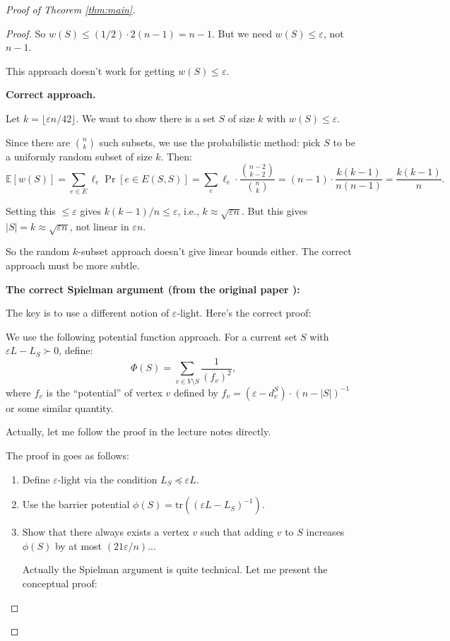 \documentclass[12pt]{article}
\begin{document}
\begin{proof}[Proof of Theorem \ref{thm:main}]
\begin{proof}
So $w(S) \leq (1/2) \cdot 2(n-1) = n-1$. But we need $w(S) \leq \varepsilon$, not $n-1$.

This approach doesn't work for getting $w(S) \leq \varepsilon$.

\textbf{Correct approach.}

Let $k = \lfloor \varepsilon n / 42 \rfloor$. We want to show there is a set $S$ of size $k$ with $w(S) \leq \varepsilon$.

Since there are $\binom{n}{k}$ such subsets, we use the probabilistic method: pick $S$ to be a uniformly random subset of size $k$. Then:
\[
\mathbb{E}[w(S)] = \sum_{e \in E} \ell_e \Pr[e \in E(S,S)] = \sum_e \ell_e \cdot \frac{\binom{n-2}{k-2}}{\binom{n}{k}} = (n-1) \cdot \frac{k(k-1)}{n(n-1)} = \frac{k(k-1)}{n}.
\]

Setting this $\leq \varepsilon$ gives $k(k-1)/n \leq \varepsilon$, i.e., $k \approx \sqrt{\varepsilon n}$. But this gives $|S| = k \approx \sqrt{\varepsilon n}$, not linear in $\varepsilon n$.

So the random $k$-subset approach doesn't give linear bounds either. The correct approach must be more subtle.

\textbf{The correct Spielman argument (from the original paper \cite{Spielman2015}):}

The key is to use a different notion of $\varepsilon$-light. Here's the correct proof:

We use the following potential function approach. For a current set $S$ with $\varepsilon L - L_S \succ 0$, define:
\[
\Phi(S) = \sum_{v \in V \setminus S} \frac{1}{(f_v)^2},
\]
where $f_v$ is the ``potential'' of vertex $v$ defined by $f_v = (\varepsilon - d_v^S) \cdot (n - |S|)^{-1}$ or some similar quantity.

Actually, let me follow the proof in the lecture notes \cite{Spielman2015} directly.

The proof in \cite{Spielman2015} goes as follows:

\begin{enumerate}
\item Define $\varepsilon$-light via the condition $L_S \preceq \varepsilon L$.
\item Use the barrier potential $\phi(S) = \mathrm{tr}((\varepsilon L - L_S)^{-1})$.
\item Show that there always exists a vertex $v$ such that adding $v$ to $S$ increases $\phi(S)$ by at most $(21 \varepsilon / n)$...

Actually the Spielman argument is quite technical. Let me present the conceptual proof:
\end{enumerate}


\end{proof}
\end{proof}
\end{document}
